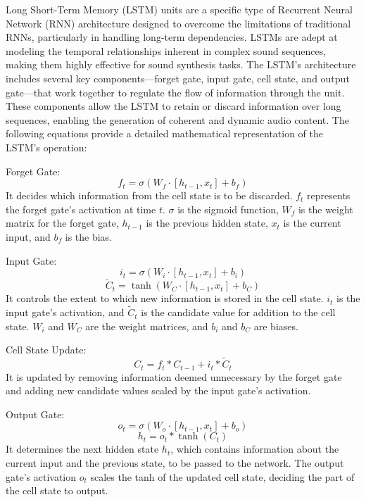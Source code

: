 \documentclass[11pt,a4paper,oneside]{report}
\begin{document}
Long Short-Term Memory (LSTM) units are a specific type of Recurrent Neural Network (RNN) architecture designed to overcome the limitations of traditional RNNs, particularly in handling long-term dependencies. LSTMs are adept at modeling the temporal relationships inherent in complex sound sequences, making them highly effective for sound synthesis tasks. The LSTM's architecture includes several key components—forget gate, input gate, cell state, and output gate—that work together to regulate the flow of information through the unit. These components allow the LSTM to retain or discard information over long sequences, enabling the generation of coherent and dynamic audio content. The following equations provide a detailed mathematical representation of the LSTM's operation:

Forget Gate:
\begin{equation}
f_t = \sigma(W_{f} \cdot [h_{t-1}, x_t] + b_f)
\end{equation}
It decides which information from the cell state is to be discarded. $f_t$ represents the forget gate's activation at time $t$. $\sigma$ is the sigmoid function, $W_{f}$ is the weight matrix for the forget gate, $h_{t-1}$ is the previous hidden state, $x_t$ is the current input, and $b_f$ is the bias.

Input Gate:
\begin{equation}
i_t = \sigma(W_{i} \cdot [h_{t-1}, x_t] + b_i)
\end{equation}
\begin{equation}
\tilde{C}_t = \tanh(W_{C} \cdot [h_{t-1}, x_t] + b_C)
\end{equation}
It controls the extent to which new information is stored in the cell state. $i_t$ is the input gate's activation, and $\tilde{C}_t$ is the candidate value for addition to the cell state. $W_{i}$ and $W_{C}$ are the weight matrices, and $b_i$ and $b_C$ are biases.

Cell State Update:
\begin{equation}
C_t = f_t \ast C_{t-1} + i_t \ast \tilde{C}_t
\end{equation}
It is updated by removing information deemed unnecessary by the forget gate and adding new candidate values scaled by the input gate's activation.

Output Gate:
\begin{equation}
o_t = \sigma(W_{o} \cdot [h_{t-1}, x_t] + b_o)
\end{equation}
\begin{equation}
h_t = o_t \ast \tanh(C_t)
\end{equation}
It determines the next hidden state $h_t$, which contains information about the current input and the previous state, to be passed to the network. The output gate's activation $o_t$ scales the tanh of the updated cell state, deciding the part of the cell state to output.
\end{document}
